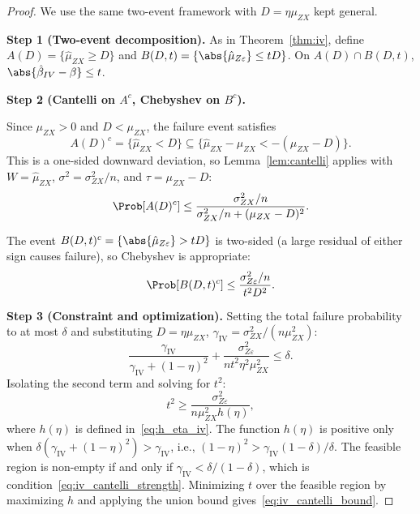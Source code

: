 \begin{proof}
    We use the same two-event framework with $D = \eta\mu_{ZX}$ kept general.

    \medskip\noindent\textbf{Step 1 (Two-event decomposition).}
    As in Theorem~\ref{thm:iv}, define $A(D) = \{\hat{\mu}_{ZX}\geq D\}$ and $B(D,t) = \{\abs{\hat{\mu}_{Z\varepsilon}}\leq tD\}$.
    On $A(D)\cap B(D,t)$, $\abs{\hat\beta_{IV}-\beta}\leq t$.

    \medskip\noindent\textbf{Step 2 (Cantelli on $A^c$, Chebyshev on $B^c$).}

    Since $\mu_{ZX}>0$ and $D<\mu_{ZX}$, the failure event satisfies
    \[
        A(D)^c = \{\hat{\mu}_{ZX} < D\}
        \subseteq
        \{\hat{\mu}_{ZX} - \mu_{ZX} < -(\mu_{ZX}-D)\}.
    \]
    This is a one-sided downward deviation, so Lemma~\ref{lem:cantelli} applies with $W=\hat{\mu}_{ZX}$, $\sigma^2=\sigma_{ZX}^2/n$, and $\tau=\mu_{ZX}-D$:
    \[
        \Prob[A(D)^c]
        \leq
        \frac{\sigma_{ZX}^2/n}{\sigma_{ZX}^2/n + (\mu_{ZX}-D)^2}.
    \]

    The event $B(D,t)^c = \{\abs{\hat{\mu}_{Z\varepsilon}}>tD\}$ is two-sided (a large residual of either sign causes failure), so Chebyshev is appropriate:
    \[
        \Prob[B(D,t)^c] \leq \frac{\sigma_{Z\varepsilon}^2/n}{t^2 D^2}.
    \]

    \medskip\noindent\textbf{Step 3 (Constraint and optimization).}
    Setting the total failure probability to at most $\delta$ and substituting $D=\eta\mu_{ZX}$, $\gamma_{\mathrm{IV}}=\sigma_{ZX}^2/(n\mu_{ZX}^2)$:
    \[
        \frac{\gamma_{\mathrm{IV}}}{\gamma_{\mathrm{IV}}+(1-\eta)^2}
        + \frac{\sigma_{Z\varepsilon}^2}{n t^2\eta^2\mu_{ZX}^2}
        \leq \delta.
    \]
    Isolating the second term and solving for $t^2$:
    \[
        t^2 \geq \frac{\sigma_{Z\varepsilon}^2}{n\mu_{ZX}^2h(\eta)},
    \]
    where $h(\eta)$ is defined in~\eqref{eq:h_eta_iv}. The function $h(\eta)$ is positive only when $\delta(\gamma_{\mathrm{IV}}+(1-\eta)^2)>\gamma_{\mathrm{IV}}$, i.e., $(1-\eta)^2>\gamma_{\mathrm{IV}}(1-\delta)/\delta$. The feasible region is non-empty if and only if $\gamma_{\mathrm{IV}}<\delta/(1-\delta)$, which is condition~\eqref{eq:iv_cantelli_strength}. Minimizing $t$ over the feasible region by maximizing $h$ and applying the union bound gives~\eqref{eq:iv_cantelli_bound}.
\end{proof}

